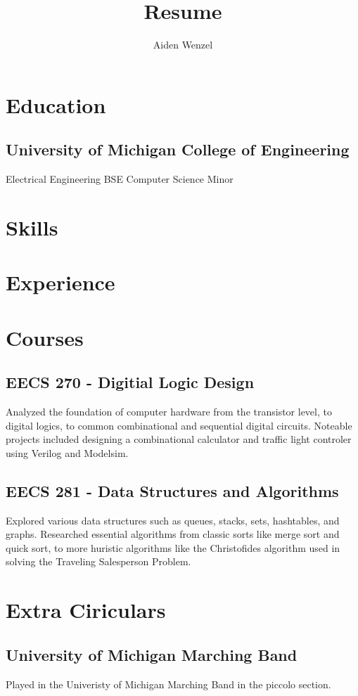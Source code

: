 \documentclass{article}
\title{Resume}
\author{Aiden Wenzel}
\begin{document}
		
\maketitle

\section{Education}
\subsection{University of Michigan College of Engineering}
Electrical Engineering BSE
Computer Science Minor

\section{Skills}

\section{Experience}

\section{Courses}
\subsection{EECS 270 - Digitial Logic Design}
Analyzed the foundation of computer hardware from the transistor level,
to digital logics, to common combinational and sequential digital circuits. 
Noteable projects included designing a combinational calculator and traffic light controler
using Verilog and Modelsim.

\subsection{EECS 281 - Data Structures and Algorithms}
Explored various data structures such as queues, stacks, sets, hashtables, and graphs.
Researched essential algorithms from classic sorts like merge sort and quick sort, to more huristic algorithms like the
Christofides algorithm used in solving the Traveling Salesperson Problem.

\section{Extra Ciriculars}
\subsection{University of Michigan Marching Band}
Played in the Univeristy of Michigan Marching Band in the piccolo section.
\end{document}
